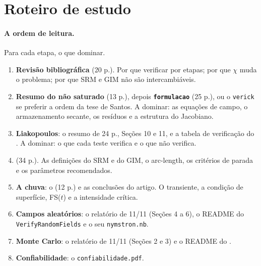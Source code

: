 \section{Roteiro de estudo}
\label{sec:roteiro}

\paragraph{A ordem de leitura.} Para cada etapa, o que dominar.
\begin{enumerate}
  \item \textbf{Revisão bibliográfica} (20 p.). Por que verificar por etapas; por que $\chi$ muda o problema; por que
    SRM e GIM não são intercambiáveis.
  \item \textbf{Resumo do não saturado} (13 p.), depois \textbf{\texttt{formulacao}} (25 p.), ou o \texttt{verick} se
    preferir a ordem da tese de Santos. A dominar: as equações de campo, o armazenamento secante, os resíduos e a
    estrutura do Jacobiano.
  \item \textbf{Liakopoulos}: o resumo de 24 p., Seções 10 e 11, e a tabela de verificação do
    . A dominar: o que cada teste verifica e o que não verifica.
  \item \textbf{} (34 p.). As definições do SRM e do GIM, o arc-length, os critérios de parada e
    os parâmetros recomendados.
  \item \textbf{A chuva}: o  (12 p.) e as conclusões do artigo. O transiente, a condição de
    superfície, FS($t$) e a intensidade crítica.
  \item \textbf{Campos aleatórios}: o relatório de 11/11 (Seções 4 a 6), o README do \texttt{VerifyRandomFields} e o
    seu \texttt{nymstron.nb}.
  \item \textbf{Monte Carlo}: o relatório de 11/11 (Seções 2 e 3) e o README do .
  \item \textbf{Confiabilidade}: o \texttt{confiabilidade.pdf}.
\end{enumerate}

